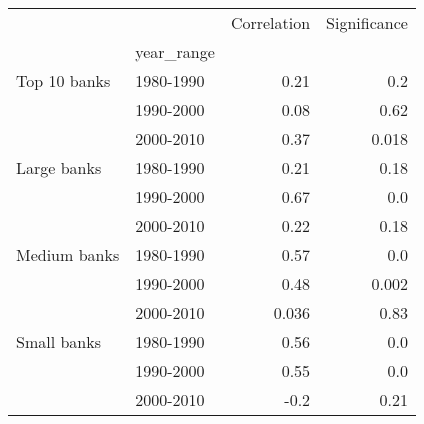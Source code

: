 \begin{tabular}{llrr}
\toprule
            &           &  Correlation &  Significance \\
{} & year\_range &              &               \\
\midrule
Top 10 banks & 1980-1990 &         0.21 &           0.2 \\
            & 1990-2000 &         0.08 &          0.62 \\
            & 2000-2010 &         0.37 &         0.018 \\
Large banks & 1980-1990 &         0.21 &          0.18 \\
            & 1990-2000 &         0.67 &           0.0 \\
            & 2000-2010 &         0.22 &          0.18 \\
Medium banks & 1980-1990 &         0.57 &           0.0 \\
            & 1990-2000 &         0.48 &         0.002 \\
            & 2000-2010 &        0.036 &          0.83 \\
Small banks & 1980-1990 &         0.56 &           0.0 \\
            & 1990-2000 &         0.55 &           0.0 \\
            & 2000-2010 &         -0.2 &          0.21 \\
\bottomrule
\end{tabular}

